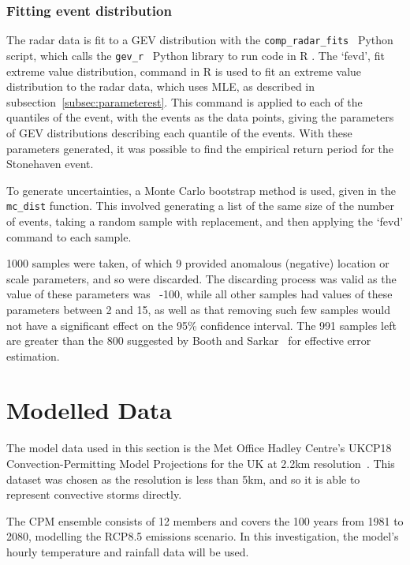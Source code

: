 \subsubsection{Fitting event distribution}

The radar data is fit to a GEV distribution with the \texttt{comp\_radar\_fits}~\cite{Me_Code} Python script,
    which calls the \texttt{gev\_r}~\cite{Me_Code} Python library to run code in R .
The `fevd', fit extreme value distribution,
    command in R is used to fit an extreme value distribution to the radar data,
    which uses MLE, as described in subsection~\ref{subsec:parameterest}.
This command is applied to each of the quantiles of the event,
    with the events as the data points,
    giving the parameters of GEV distributions describing each quantile of the events.
With these parameters generated,
     it was possible to find the empirical return period for the Stonehaven event.

To generate uncertainties,
    a Monte Carlo bootstrap method is used,
    given in the \texttt{mc\_dist} function.
This involved generating a list of the same size of the number of events,
    taking a random sample with replacement,
    and then applying the `fevd' command to each sample.

1000 samples were taken,
    of which 9 provided anomalous (negative) location or scale parameters,
    and so were discarded.
The discarding process was valid as the value of these parameters was ~-100,
    while all other samples had values of these parameters between 2 and 15,
    as well as that removing such few samples would not have a significant effect on the 95\% confidence interval.
The 991 samples left are greater than the 800 suggested by Booth and Sarkar~\cite{Booth_Sarkar_1998}
    for effective error estimation.

\section{Modelled Data}\label{sec:model}

The model data used in this section is
    the Met Office Hadley Centre's UKCP18 Convection-Permitting Model Projections for the UK at 2.2km resolution~\cite{model_data}.
This dataset was chosen as the resolution is less than 5km,
    and so it is able to represent convective storms directly.

The CPM ensemble consists of 12 members and covers the 100 years from 1981 to 2080,
    modelling the RCP8.5 emissions scenario.
In this investigation,
    the model's hourly temperature and rainfall data will be used.

